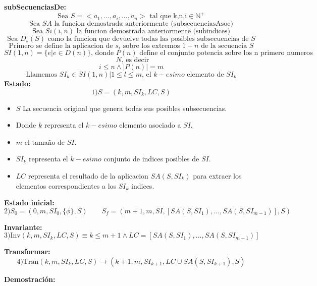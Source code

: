 \documentclass[12pt, a4paper]{article}
\begin{document}
  \textbf{subSecuenciasDe: } \\
  \[ \text{Sea } S =<a_1,...,a_i,...,a_n> \text{ tal que k,n,i} \in \mathbb{N}^{+} \]
  \[ \text{Sea } SA \text{ la funcion demostrada anteriormente (subsecuenciasAsoc)}  \]
  \[ \text{Sea } Si(i,n) \text{ la funcion demostrada anteriormente (subindices)}  \]
  \[ \text{Sea } D_s(S) \text{ como la funcion que devuelve todas las posibles subsecuencias de }S\]
  \[\text{Primero se define la aplicacion de } s_i \text{ sobre  los extremos $1-n$ de la secuencia } S\]
  \[ SI (1,n) = \{e | e \in D(n)\} \text{, donde $P(n)$ define el conjunto potencia sobre los n primero numeros}\]
  \[ \text{ $N$, es decir } \]
  \[ i \leq n \land |P(n)| = m\]
  \[ \text{Llamemos $SI_k \in SI(1,n) | 1 \leq l \leq m$, el $k-esimo$ elemento de $SI_k$}\]  
  \textbf{Estado:}
  \[ 1) S=(k,m,SI_k,LC,S) \]
  \begin{itemize}
    \item $S$ La secuencia original que genera todas sus posibles subsecuencias.
    \item Donde $k$ representa el $k-esimo$ elemento asociado a $SI$.
    \item $m$ el tamaño de $SI$.
    \item $SI_k$ representa el $k-esimo$ conjunto de indices posibles de $SI$.
    \item $LC$ representa el resultado de la aplicacion $SA(S,SI_k)$ para extraer los elementos correspondientes a los $SI_k$ indices.
  \end{itemize}
    
  \textbf{Estado inicial:}
  \[ 2) S_0 =(0,m,SI_0,\{\phi\},S) \qquad S_f=(m+1,m,SI,[SA(S,SI_1),...,SA(S,SI_{m-1})],S) \]
  
  
  \textbf{Invariante:}
  \[ 3) \text{Inv}(k,m,SI_k,LC,S) \equiv k \leq m+1 \land LC  =[SA(S,SI_1),...,SA(S,SI_{m-1})] \]
  
  \textbf{Transformar:}
  \[ 4) \text{Tran}(k,m,SI_k,LC,S) \rightarrow (k+1,m,SI_{k+1},LC \cup SA(S,SI_{k+1}),S) \]
  
  \textbf{Demostración:}
  
\end{document}
